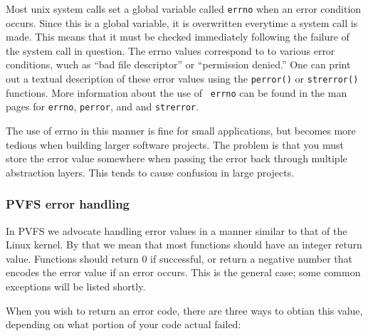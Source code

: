 \documentclass[11pt, letterpaper]{article}
\begin{document}
Most unix system calls set a global variable called {\tt errno} when an
error condition occurs.  Since this is a global variable, it is
overwritten everytime a system call is made.  This means that it must be
checked immediately following the failure of the system call in
question.  The errno values correspond to to various error conditions,
wuch as ``bad file descriptor'' or ``permission denied.''  One can print
out a textual description of these error values using the {\tt perror()}
or {\tt strerror()} functions.  More information about the use of {\tt
errno} can be found in the man pages for {\tt errno}, {\tt perror}, and
and {\tt strerror}.

The use of errno in this manner is fine for small applications, but
becomes more tedious when building larger software projects.  The
problem is that you must store the error value somewhere when passing
the error back through multiple abstraction layers.  This tends to cause
confusion in large projects.

\subsubsection{PVFS error handling}

In PVFS we advocate handling error values in a manner similar to that of
the Linux kernel.  By that we mean that most functions should have an
integer return value.  Functions should return 0 if successful, or
return a negative number that encodes the error value if an error
occurs.  This is the general case; some common exceptions will be listed
shortly.

When you wish to return an error code, there are three ways to obtian
this value, depending on what portion of your code actual failed:
\end{document}
